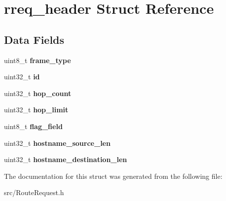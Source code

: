 \hypertarget{structrreq__header}{\section{rreq\-\_\-header Struct Reference}
\label{structrreq__header}
}
\subsection*{Data Fields}
\begin{DoxyCompactItemize}
\item 
\hypertarget{structrreq__header_a463a2c2d5a33a4efc9b9f4fe281c0f54}{uint8\-\_\-t {\bfseries frame\-\_\-type}}\label{structrreq__header_a463a2c2d5a33a4efc9b9f4fe281c0f54}

\item 
\hypertarget{structrreq__header_a715128ca69f8609891a5ba02936ec1e7}{uint32\-\_\-t {\bfseries id}}\label{structrreq__header_a715128ca69f8609891a5ba02936ec1e7}

\item 
\hypertarget{structrreq__header_a0bd7facab67ef6b092415d7e9d541a67}{uint32\-\_\-t {\bfseries hop\-\_\-count}}\label{structrreq__header_a0bd7facab67ef6b092415d7e9d541a67}

\item 
\hypertarget{structrreq__header_ab93ee70a23ce9881a8ce98082c0ca277}{uint32\-\_\-t {\bfseries hop\-\_\-limit}}\label{structrreq__header_ab93ee70a23ce9881a8ce98082c0ca277}

\item 
\hypertarget{structrreq__header_a02a72c2114308d8207377fcdb1e921ea}{uint8\-\_\-t {\bfseries flag\-\_\-field}}\label{structrreq__header_a02a72c2114308d8207377fcdb1e921ea}

\item 
\hypertarget{structrreq__header_a4b483117981c20b91ae391fa46de1b3c}{uint32\-\_\-t {\bfseries hostname\-\_\-source\-\_\-len}}\label{structrreq__header_a4b483117981c20b91ae391fa46de1b3c}

\item 
\hypertarget{structrreq__header_ac359770edf9b683681c83b82e3d5d3bf}{uint32\-\_\-t {\bfseries hostname\-\_\-destination\-\_\-len}}\label{structrreq__header_ac359770edf9b683681c83b82e3d5d3bf}

\end{DoxyCompactItemize}


The documentation for this struct was generated from the following file\-:\begin{DoxyCompactItemize}
\item 
src/Route\-Request.\-h\end{DoxyCompactItemize}
